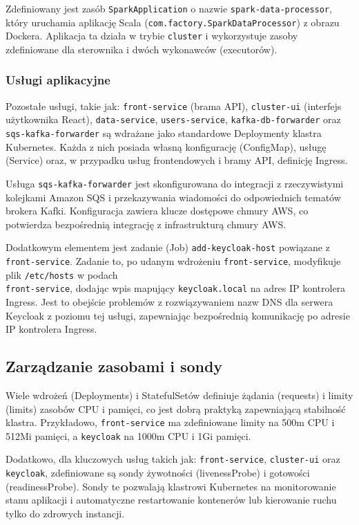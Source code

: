 Zdefiniowany jest zasób \texttt{SparkApplication} o nazwie \texttt{spark-data-processor}, który uruchamia aplikację Scala (\texttt{com.factory.SparkDataProcessor}) z obrazu Dockera. Aplikacja ta działa w trybie \texttt{cluster} i wykorzystuje zasoby zdefiniowane dla sterownika i dwóch wykonawców (executorów).

\subsubsection{Usługi aplikacyjne}
Pozostałe usługi, takie jak: \texttt{front-service} (brama API), \texttt{cluster-ui} (interfejs użytkownika React), \texttt{data-service}, \texttt{users-service}, \texttt{kafka-db-forwarder} oraz \texttt{sqs-kafka-forwarder} są wdrażane jako standardowe Deploymenty klastra Kubernetes. Każda z nich posiada własną konfigurację (ConfigMap), usługę (Service) oraz, w przypadku usług frontendowych i bramy API, definicję Ingress.

Usługa \texttt{sqs-kafka-forwarder} jest skonfigurowana do integracji z rzeczywistymi kolejkami Amazon SQS i przekazywania wiadomości do odpowiednich tematów brokera Kafki. Konfiguracja zawiera klucze dostępowe chmury AWS, co potwierdza bezpośrednią integrację z infrastrukturą chmury AWS.

Dodatkowym elementem jest zadanie (Job) \texttt{add-keycloak-host} powiązane z \texttt{front-service}. Zadanie to, po udanym wdrożeniu \texttt{front-service}, modyfikuje plik \texttt{/etc/hosts} w podach \\ \texttt{front-service}, dodając wpis mapujący \texttt{keycloak.local} na adres IP kontrolera Ingress. Jest to obejście problemów z rozwiązywaniem nazw DNS dla serwera Keycloak z poziomu tej usługi, zapewniając bezpośrednią komunikację po adresie IP kontrolera Ingress.

\subsection{Zarządzanie zasobami i sondy}

Wiele wdrożeń (Deployments) i StatefulSetów definiuje żądania (requests) i limity (limits) zasobów CPU i pamięci, co jest dobrą praktyką zapewniającą stabilność klastra. Przykładowo, \texttt{front-service} ma zdefiniowane limity na 500m CPU i 512Mi pamięci, a \texttt{keycloak} na 1000m CPU i 1Gi pamięci.

Dodatkowo, dla kluczowych usług takich jak: \texttt{front-service}, \texttt{cluster-ui} oraz \texttt{keycloak}, zdefiniowane są sondy żywotności (livenessProbe) i gotowości (readinessProbe). Sondy te pozwalają klastrowi Kubernetes na monitorowanie stanu aplikacji i automatyczne restartowanie kontenerów lub kierowanie ruchu tylko do zdrowych instancji.
